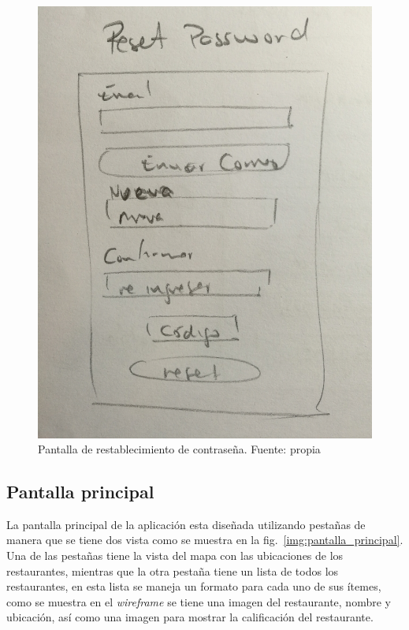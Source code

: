 \documentclass[12pt,letterpaper]{article}
\begin{document}
\begin{figure}[h!]
	\begin{center}
		\includegraphics[scale=0.07]{pantalla_reset.jpg}
		\caption{Pantalla de restablecimiento de contraseña. Fuente: propia}
		\label{img:pantalla_reset}
	\end{center}
\end{figure}

\subsection{Pantalla principal}
La pantalla principal de la aplicación esta diseñada utilizando pestañas de manera que se tiene dos vista como se muestra en la fig.~\ref{img:pantalla_principal}. Una de las pestañas tiene la vista del mapa con las ubicaciones de los restaurantes, mientras que la otra pestaña tiene un lista de todos los restaurantes, en esta lista se maneja un formato para cada uno de sus ítemes, como se muestra en el \textit{wireframe} se tiene una imagen del restaurante, nombre y ubicación, así como una imagen para mostrar la calificación del restaurante.
\end{document}
